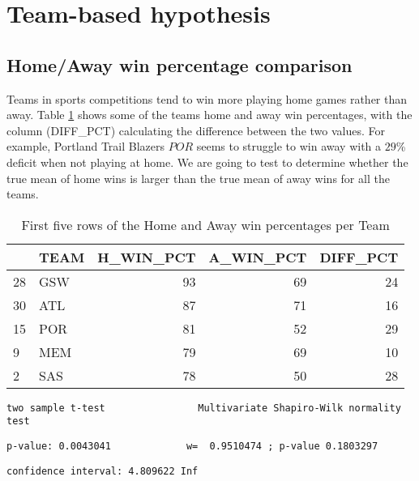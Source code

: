 \documentclass[
  12pt,
]{article}
\begin{document}
\newpage

\hypertarget{sec:TeamBased}{%
\section{Team-based hypothesis}\label{sec:TeamBased}}

\hypertarget{sec:Home-Away}{%
\subsection{Home/Away win percentage comparison}\label{sec:Home-Away}}

Teams in sports competitions tend to win more playing home games rather than away. Table \ref{tab:h-a-diff} shows some of the teams home and away win percentages, with the column (DIFF\_PCT) calculating the difference between the two values. For example, Portland Trail Blazers \(POR\) seems to struggle to win away with a \(29\)\% deficit when not playing at home. We are going to test to determine whether the true mean of home wins is larger than the true mean of away wins for all the teams.

\begin{table}

\caption{\label{tab:h-a-diff}First five rows of the Home and Away win percentages per Team}
\centering
\begin{tabular}[t]{llrrr}
\toprule
  & TEAM & H\_WIN\_PCT & A\_WIN\_PCT & DIFF\_PCT\\
\midrule
28 & GSW & 93 & 69 & 24\\
30 & ATL & 87 & 71 & 16\\
15 & POR & 81 & 52 & 29\\
9 & MEM & 79 & 69 & 10\\
2 & SAS & 78 & 50 & 28\\
\bottomrule
\end{tabular}
\end{table}

\begin{verbatim}
two sample t-test                Multivariate Shapiro-Wilk normality test
\end{verbatim}

\begin{verbatim}
p-value: 0.0043041             w=  0.9510474 ; p-value 0.1803297
\end{verbatim}

\begin{verbatim}
confidence interval: 4.809622 Inf
\end{verbatim}
\end{document}
